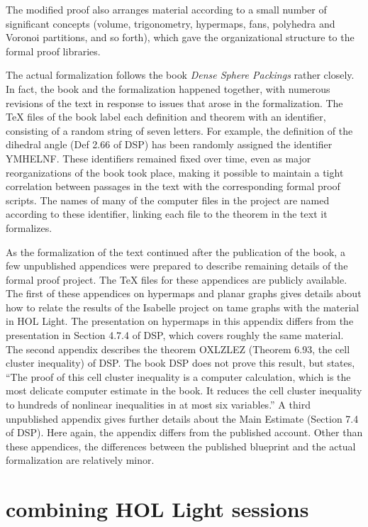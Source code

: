 The modified proof also arranges material according to a small number of significant concepts
(volume, trigonometry, hypermaps, fans, polyhedra and Voronoi partitions, and so forth), which
gave the organizational structure to the formal proof libraries.

The actual formalization follows the book {\it Dense Sphere Packings} rather closely.  In fact, the book and the formalization
happened together, with numerous revisions of the text in response to issues that arose in the formalization.  The TeX files
of the book label each definition and theorem with an identifier, 
consisting of a random string of seven letters.  For example, the definition of the dihedral angle (Def 2.66 of DSP) has been randomly
assigned the identifier YMHELNF. These identifiers remained
fixed over time, even as major reorganizations of the book took place, making it possible to maintain a tight  correlation between
 passages in the text with
the corresponding formal proof scripts.  The names of many of the computer files in the project are named according to
these identifier, linking each file to the theorem in the text it formalizes.

As the formalization of the text continued after the publication of the book, a few unpublished appendices were prepared
to describe remaining details of the formal proof project.  The TeX files for these appendices are publicly available.
The first of these appendices on hypermaps and planar graphs
gives details about how to relate the results of the Isabelle project on tame graphs with the material in HOL Light.
The presentation on hypermaps in this appendix differs from the presentation in Section 4.7.4 of DSP, which covers
roughly the same material.  
The second appendix describes the theorem OXLZLEZ (Theorem 6.93, the cell cluster inequality) of DSP.   The book DSP
does not prove this result, but states, ``The proof of this cell cluster inequality is a computer calculation, which is the most
delicate computer estimate in the book.  It reduces the cell cluster inequality to hundreds of nonlinear inequalities in at most
six variables.''    A third unpublished appendix gives further details about the Main Estimate (Section 7.4 of DSP).  Here again,
the appendix differs from the published account.  Other than these appendices, the differences between the published blueprint
and the actual formalization are relatively minor.




\section{combining HOL Light sessions}

